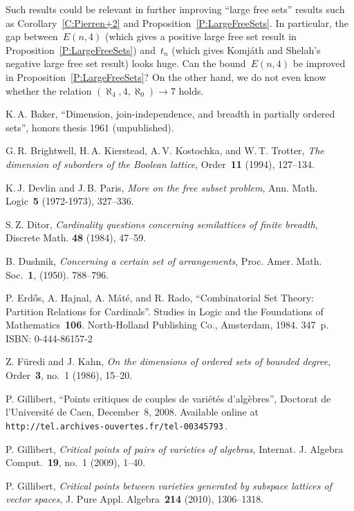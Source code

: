 \documentclass[psamsfonts,reqno]{amsart}
\theoremstyle{plain}
\theoremstyle{definition}
\theoremstyle{remark}
\numberwithin{equation}{section}
\numberwithin{figure}{section}
\begin{document}
Such results could be relevant in further improving ``large free sets'' results such as Corollary~\ref{C:Pierren+2} and Proposition~\ref{P:LargeFreeSets}. In particular, the gap between~$E(n,4)$ (which gives a positive large free set result in Proposition~\ref{P:LargeFreeSets}) and~$t_n$ (which gives Komj\'ath and Shelah's negative large free set result) looks huge. Can the bound~$E(n,4)$ be improved in Proposition~\ref{P:LargeFreeSets}? On the other hand, we do not even know whether the relation $(\aleph_4,4,\aleph_0)\rightarrow7$ holds.

\begin{thebibliography}{99}
K.\,A. Baker, ``Dimension, join-independence, and breadth in partially ordered sets'', honors thesis 1961 (unpublished).

G.\,R. Brightwell, H.\,A. Kierstead, A.\,V. Kostochka, and W.\,T. Trotter,
\emph{The dimension of suborders of the Boolean lattice}, Order~\textbf{11} (1994), 127--134.

K.\,J. Devlin and J.\,B. Paris,
\emph{More on the free subset problem}, Ann. Math. Logic~\textbf{5} (1972-1973), 327--336.

S.\,Z. Ditor,
\emph{Cardinality questions concerning semilattices of finite breadth},
Discrete Math. \textbf{48} (1984), 47--59.

B. Dushnik,
\emph{Concerning a certain set of arrangements}, 
Proc. Amer. Math. Soc.~\textbf{1}, (1950). 788--796.

P. Erd\H{o}s, A. Hajnal, A. M\'at\'e, and R. Rado,
``Combinatorial Set Theory: Partition Relations for Cardinals''.
Studies in Logic and the Foundations of Mathematics~\textbf{106}. North-Holland Publishing Co., Amsterdam, 1984. 347~p. ISBN: 0-444-86157-2

Z. F\"uredi and J. Kahn,
\emph{On the dimensions of ordered sets of bounded degree},
Order~\textbf{3}, no.~1 (1986), 15--20.

P. Gillibert, ``Points critiques de couples de vari\'et\'es d'alg\`ebres'', Doc\-to\-rat de l'U\-ni\-ver\-si\-t\'e de Caen, December~8, 2008. Available online at \texttt{http://tel.archives-ouvertes.fr/tel-00345793}\,.

P. Gillibert, \emph{Critical points of pairs of varieties of algebras}, Internat. J. Algebra Comput.~\textbf{19}, no.~1 (2009), 1--40.

P. Gillibert,
\emph{Critical points between varieties generated by subspace lattices of vector spaces}, J. Pure Appl. Algebra~\textbf{214} (2010), 1306--1318.


\end{thebibliography}
\end{document}
